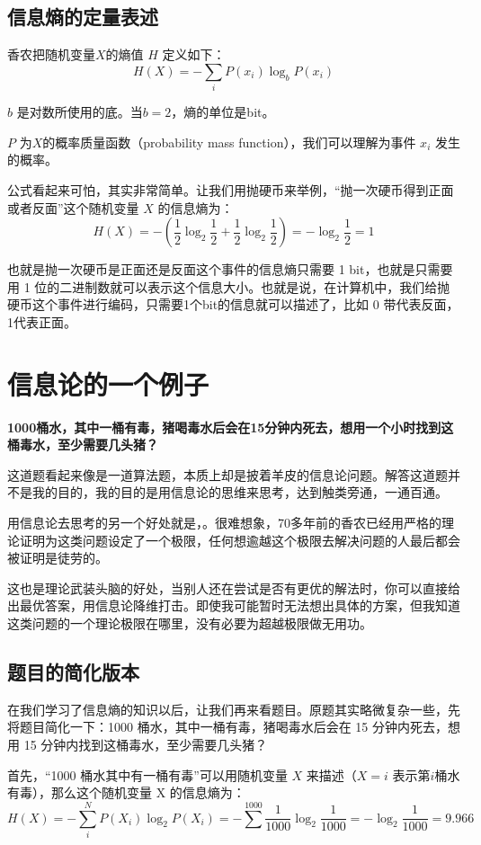 \documentclass[12pt]{article}
\begin{document}
\subsection{信息熵的定量表述}
香农把随机变量$X$的熵值 $Η$ 定义如下：
$$H(X) = -\sum_i{P(x_i)\log_bP(x_i)}$$

$b$ 是对数所使用的底。当$b=2$，熵的单位是bit。

$P$ 为$X$的概率质量函数（probability mass function），我们可以理解为事件 $x_i$ 发生的概率。

公式看起来可怕，其实非常简单。让我们用抛硬币来举例，“抛一次硬币得到正面或者反面”这个随机变量 $X$ 的信息熵为：
$$H(X) = -(\frac{1}{2}\log_2{\frac{1}{2}}+\frac{1}{2}\log_2{\frac{1}{2}}) = -\log_2{\frac{1}{2}} = 1 $$

也就是抛一次硬币是正面还是反面这个事件的信息熵只需要 1 bit，也就是只需要用 1 位的二进制数就可以表示这个信息大小。也就是说，在计算机中，我们给抛硬币这个事件进行编码，只需要1个bit的信息就可以描述了，比如 0 带代表反面，1代表正面。

\section{信息论的一个例子}
\textbf{1000桶水，其中一桶有毒，猪喝毒水后会在15分钟内死去，想用一个小时找到这桶毒水，至少需要几头猪？}

这道题看起来像是一道算法题，本质上却是披着羊皮的信息论问题。解答这道题并不是我的目的，我的目的是用信息论的思维来思考，达到触类旁通，一通百通。

用信息论去思考的另一个好处就是，{\color{red}{信息论给了这类问题的一个边界，让我们在边界范围内思考问题}}。很难想象，70多年前的香农已经用严格的理论证明为这类问题设定了一个极限，任何想逾越这个极限去解决问题的人最后都会被证明是徒劳的。

这也是理论武装头脑的好处，当别人还在尝试是否有更优的解法时，你可以直接给出最优答案，用信息论降维打击。即使我可能暂时无法想出具体的方案，但我知道这类问题的一个理论极限在哪里，没有必要为超越极限做无用功。

\subsection{题目的简化版本}

在我们学习了信息熵的知识以后，让我们再来看题目。原题其实略微复杂一些，先将题目简化一下：1000 桶水，其中一桶有毒，猪喝毒水后会在 15 分钟内死去，想用 15 分钟内找到这桶毒水，至少需要几头猪？

首先，“1000 桶水其中有一桶有毒”可以用随机变量 $X$ 来描述（$X=i$ 表示第$i$桶水有毒），那么这个随机变量 X 的信息熵为：
$$
H(X) = -\sum_i^{N}P(X_i)\log_2{P(X_i)} = -\sum^{1000}\frac{1}{1000}\log_2{\frac{1}{1000 }} = -\log_2{\frac{1}{1000}} = 9.966
$$
\end{document}
